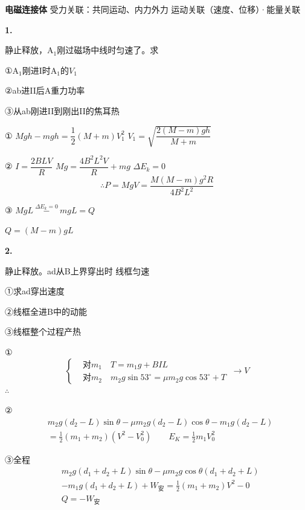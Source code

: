 \textbf{电磁连接体} \quad 受力关联：共同运动、内力外力 \quad 运动关联（速度、位移）·能量关联

\textbf{1.}

\begin{problem}
静止释放，A$_1$刚过磁场中线时匀速了。求

①A$_1$刚进I时A$_1$的$V_1$

②ab进II后A重力功率

③从ab刚进II到刚出II的焦耳热
\begin{solution}
① $Mgh-mgh=\dfrac12(M+m)V_1^{2}$ \qquad $V_1=\sqrt{\dfrac{2(M-m)gh}{M+m}}$

②  \quad $I=\dfrac{2BLV}{R}$ \qquad $Mg=\dfrac{4B^{2}L^{2}V}{R}+mg$ \qquad $\Delta E_k=0$ 
\[ \therefore P=MgV=\frac{M(M-m)g^{2}R}{4B^{2}L^{2}} \]

③ $MgL\ \overset{\Delta E_k=0}{-}\ mgL=Q$

$Q=(M-m)gL$
\end{solution}
\end{problem}

\textbf{2.}

\begin{problem}
静止释放。ad从B上界穿出时 线框匀速

①求ad穿出速度

②线框全进B中的动能

③线框整个过程产热
\begin{solution}
①
\[ \left\{\begin{aligned} &\text{对}m_1\quad T=m_1g+BIL\\ &\text{对}m_2\quad m_2g\sin53^\circ=\mu m_2g\cos53^\circ+T\end{aligned}\right.\ \to V \]
$\therefore$ 

②
\begin{align*}
&m_2g(d_2-L)\sin\theta-\mu m_2g(d_2-L)\cos\theta-m_1g(d_2-L)\\
&=\frac12(m_1+m_2)(V^{2}-V_0^{2})\qquad E_K=\frac12 m_1V_0^{2}
\end{align*}

③全程
\begin{align*}
&m_2g(d_1+d_2+L)\sin\theta-\mu m_2g\cos\theta(d_1+d_2+L)\\
&-m_1g(d_1+d_2+L)+W_{\text{安}}=\frac12(m_1+m_2)V^{2}-0\\
&Q=-W_{\text{安}}
\end{align*}
\end{solution}
\end{problem}



